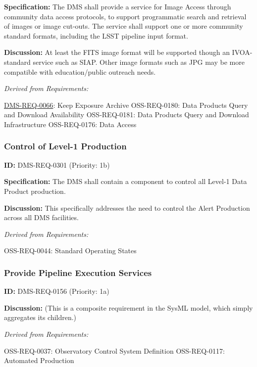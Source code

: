 \documentclass[SE,toc,lsstdraft]{lsstdoc}
\begin{document}
\textbf{Specification:} The DMS shall provide a service for Image Access through community data access protocols, to support programmatic search and retrieval of images or image cut-outs. The service shall support one or more community standard formats, including the LSST pipeline input format.

\textbf{Discussion:} At least the FITS image format will be supported though an IVOA-standard service such as SIAP. Other image formats such as JPG may be more compatible with education/public outreach needs.

\emph{Derived from Requirements:}

\hyperref[DMS-REQ-0066]{DMS-REQ-0066}:
Keep Exposure Archive \newline
OSS-REQ-0180:
Data Products Query and Download Availability \newline
OSS-REQ-0181:
Data Products Query and Download Infrastructure \newline
OSS-REQ-0176:
Data Access \newline

\subsubsection{Control of Level-1 Production}

\label{DMS-REQ-0301}
\textbf{ID:} DMS-REQ-0301 (Priority: 1b)

\textbf{Specification:} The DMS shall contain a component to control all Level-1 Data Product production.

\textbf{Discussion: }This specifically addresses the need to control the Alert Production across all DMS facilities.

\emph{Derived from Requirements:}

OSS-REQ-0044:
Standard Operating States \newline

\subsubsection{Provide Pipeline Execution Services}

\label{DMS-REQ-0156}
\textbf{ID:} DMS-REQ-0156 (Priority: 1a)

\textbf{Discussion:}
(This is a composite requirement in the SysML model, which simply aggregates its children.)

\emph{Derived from Requirements:}

OSS-REQ-0037:
Observatory Control System Definition \newline
OSS-REQ-0117:
Automated Production \newline
\end{document}
